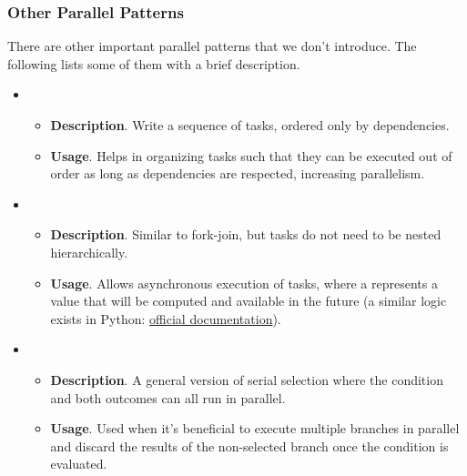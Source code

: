 \subsubsection{Other Parallel Patterns}

There are other important parallel patterns that we don't introduce. The following lists some of them with a brief description.
\begin{itemize}
    \item {}
    \begin{itemize}
        \item[\textcolor{Red2}{\faIcon{book}}] \textcolor{Red2}{\textbf{Description}}. Write a sequence of tasks, ordered only by dependencies.

        \item[\textcolor{Green3}{\faIcon{question}}] \textcolor{Green3}{\textbf{Usage}}. Helps in organizing tasks such that they can be executed out of order as long as dependencies are respected, increasing parallelism.
    \end{itemize}


    \item {}
    \begin{itemize}
        \item[\textcolor{Red2}{\faIcon{book}}] \textcolor{Red2}{\textbf{Description}}. Similar to fork-join, but tasks do not need to be nested hierarchically.

        \item[\textcolor{Green3}{\faIcon{question}}] \textcolor{Green3}{\textbf{Usage}}. Allows asynchronous execution of tasks, where a  represents a value that will be computed and available in the future (a similar logic exists in Python: \href{https://docs.python.org/3/library/asyncio-future.html#asyncio.Future}{official documentation}).
    \end{itemize}


    \item {}
    \begin{itemize}
        \item[\textcolor{Red2}{\faIcon{book}}] \textcolor{Red2}{\textbf{Description}}. A general version of serial selection where the condition and both outcomes can all run in parallel.

        \item[\textcolor{Green3}{\faIcon{question}}] \textcolor{Green3}{\textbf{Usage}}. Used when it's beneficial to execute multiple branches in parallel and discard the results of the non-selected branch once the condition is evaluated.
    \end{itemize}



\end{itemize}

